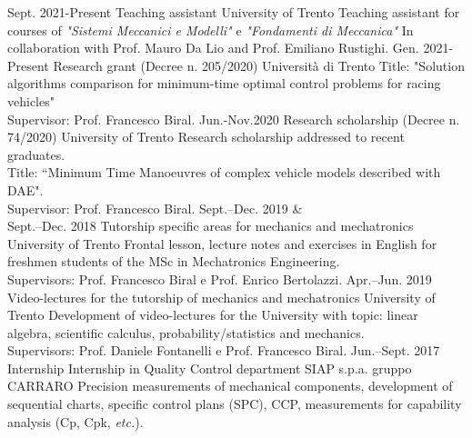 \documentclass[9pt]{developercv_mattia} %
\begin{document}
%
\begin{entrylist}
	\entry
		{Sept. 2021-Present}
		{Teaching assistant}
		{University of Trento}
		{Teaching assistant for courses of \textit{"Sistemi Meccanici e Modelli"} e \textit{"Fondamenti di Meccanica"} In collaboration with Prof. Mauro Da Lio and Prof. Emiliano Rustighi.}
	\entry
		{Gen. 2021-Present}
		{Research grant (Decree n. 205/2020)}
		{Università di Trento}
		{Title: "Solution algorithms comparison for minimum-time optimal control problems for racing vehicles"\\
		Supervisor: Prof. Francesco Biral.}
	\entry
		{Jun.-Nov.2020}
		{Research scholarship (Decree n. 74/2020)}
		{University of Trento}
		{Research scholarship addressed to recent graduates.\\ 
		Title: “Minimum Time Manoeuvres of complex vehicle models described with DAE".\\ 
		Supervisor: Prof. Francesco Biral.}
	\entry
		{Sept.--Dec. 2019 \&\\Sept.--Dec. 2018}
		{Tutorship specific areas for mechanics and mechatronics}
		{University of Trento}
		{Frontal lesson, lecture notes and exercises in English for freshmen students of the MSc in Mechatronics Engineering.\\
		Supervisors: Prof. Francesco Biral e Prof. Enrico Bertolazzi.}
	\entry
		{Apr.--Jun. 2019}
		{Video-lectures for the tutorship of mechanics and mechatronics}
		{University of Trento}
		{Development of video-lectures for the University with topic: linear algebra, scientific calculus, probability/statistics and mechanics.\\
		Supervisors: Prof. Daniele Fontanelli e Prof. Francesco Biral.}
	\entry
		{Jun.--Sept. 2017\\\footnotesize{Internship}}
		{Internship in Quality Control department}
		{SIAP s.p.a. gruppo CARRARO}
		{Precision measurements of mechanical components, development of sequential charts, specific control plans (SPC), CCP, measurements for capability analysis (Cp, Cpk, \textit{etc.}).
		}
\end{entrylist}
%
%
%
\end{document}
